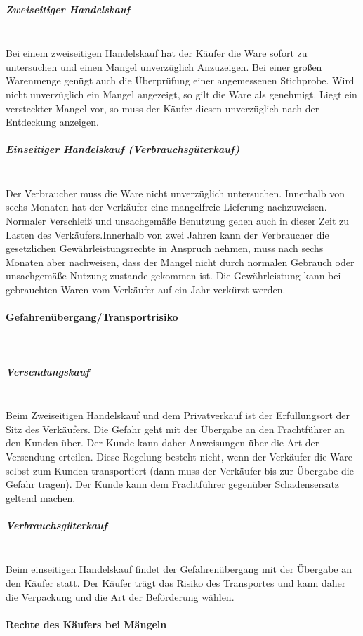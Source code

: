 \subparagraph{Zweiseitiger Handelskauf}~\\
Bei einem zweiseitigen Handelskauf hat der Käufer die Ware sofort zu untersuchen und einen Mangel unverzüglich Anzuzeigen. Bei einer großen Warenmenge genügt auch die Überprüfung einer angemessenen Stichprobe. Wird nicht unverzüglich ein Mangel angezeigt, so gilt die Ware als genehmigt. Liegt ein versteckter Mangel vor, so muss der Käufer diesen unverzüglich nach der Entdeckung anzeigen.

\subparagraph{Einseitiger Handelskauf (Verbrauchsgüterkauf)}~\\
Der Verbraucher muss die Ware nicht unverzüglich untersuchen. Innerhalb von sechs Monaten hat der Verkäufer eine mangelfreie Lieferung nachzuweisen. Normaler Verschleiß und unsachgemäße Benutzung gehen auch in dieser Zeit zu Lasten des Verkäufers.Innerhalb von zwei Jahren kann der Verbraucher die gesetzlichen Gewährleistungsrechte in Anspruch nehmen, muss nach sechs Monaten aber nachweisen, dass der Mangel nicht durch normalen Gebrauch oder unsachgemäße Nutzung zustande gekommen ist. Die Gewährleistung kann bei gebrauchten Waren vom Verkäufer auf ein Jahr verkürzt werden.
	
\paragraph{Gefahrenübergang/Transportrisiko}~\\

\subparagraph{Versendungskauf}~\\
Beim Zweiseitigen Handelskauf und dem Privatverkauf ist der Erfüllungsort der Sitz des Verkäufers. Die Gefahr geht mit der Übergabe an den Frachtführer an den Kunden über. Der Kunde kann daher Anweisungen über die Art der Versendung erteilen. Diese Regelung besteht nicht, wenn der Verkäufer die Ware selbst zum Kunden transportiert (dann muss der Verkäufer bis zur Übergabe die Gefahr tragen). Der Kunde kann dem Frachtführer gegenüber Schadensersatz geltend machen.

\subparagraph{Verbrauchsgüterkauf}~\\
Beim einseitigen Handelskauf findet der Gefahrenübergang mit der Übergabe an den Käufer statt. Der Käufer trägt das Risiko des Transportes und kann daher die Verpackung und die Art der Beförderung wählen.
	
\paragraph{Rechte des Käufers bei Mängeln}~\\

